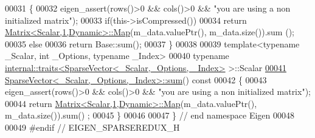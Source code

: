 \begin{DoxyCode}
00031 \textcolor{keyword}{}\{
00032   eigen\_assert(rows()>0 && cols()>0 && \textcolor{stringliteral}{"you are using a non initialized matrix"});
00033   \textcolor{keywordflow}{if}(this->isCompressed())
00034     \textcolor{keywordflow}{return} \hyperlink{group___core___module_class_eigen_1_1_matrix}{Matrix<Scalar,1,Dynamic>::Map}(m\_data.valuePtr(), m\_data.size()).sum
      ();
00035   \textcolor{keywordflow}{else}
00036     \textcolor{keywordflow}{return} Base::sum();
00037 \}
00038 
00039 \textcolor{keyword}{template}<\textcolor{keyword}{typename} \_Scalar, \textcolor{keywordtype}{int} \_Options, \textcolor{keyword}{typename} \_Index>
00040 \textcolor{keyword}{typename} \hyperlink{struct_eigen_1_1internal_1_1traits}{internal::traits<SparseVector<\_Scalar,\_Options, \_Index>}
       >::Scalar
\hyperlink{group___sparse_core___module_a05e8aff0ba5c4dd4ab69e173d80d1a68}{00041} \hyperlink{group___sparse_core___module_a05e8aff0ba5c4dd4ab69e173d80d1a68}{SparseVector<\_Scalar,\_Options,\_Index>::sum}()\textcolor{keyword}{ const}
00042 \textcolor{keyword}{}\{
00043   eigen\_assert(rows()>0 && cols()>0 && \textcolor{stringliteral}{"you are using a non initialized matrix"});
00044   \textcolor{keywordflow}{return} \hyperlink{group___core___module_class_eigen_1_1_matrix}{Matrix<Scalar,1,Dynamic>::Map}(m\_data.valuePtr(), m\_data.size()).sum()
      ;
00045 \}
00046 
00047 \} \textcolor{comment}{// end namespace Eigen}
00048 
00049 \textcolor{preprocessor}{#endif // EIGEN\_SPARSEREDUX\_H}
\end{DoxyCode}
